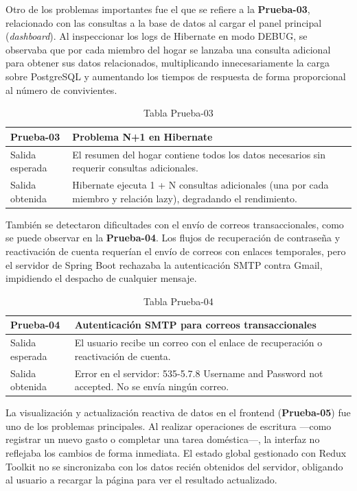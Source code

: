 Otro de los problemas importantes fue el que se refiere a la \textbf{Prueba-03}, relacionado con las consultas a la base de datos al cargar el panel principal (\emph{dashboard}). Al inspeccionar los logs de Hibernate en modo DEBUG, se observaba que por cada miembro del hogar se lanzaba una consulta adicional para obtener sus datos relacionados, multiplicando innecesariamente la carga sobre PostgreSQL y aumentando los tiempos de respuesta de forma proporcional al número de convivientes.

\begin{table}[H]
\centering
\begin{tabular}{|p{}|p{}|}
\hline
\textbf{Prueba-03} & \textbf{Problema N+1 en Hibernate} \\ \hline
Salida esperada & El resumen del hogar contiene todos los datos necesarios sin requerir consultas adicionales. \\ \hline
Salida obtenida & Hibernate ejecuta 1 + N consultas adicionales (una por cada miembro y relación lazy), degradando el rendimiento. \\ \hline
\end{tabular}
\caption{Tabla Prueba-03}
\label{tab:prueba03}
\end{table}

También se detectaron dificultades con el envío de correos transaccionales, como se puede observar en la \textbf{Prueba-04}. Los flujos de recuperación de contraseña y reactivación de cuenta requerían el envío de correos con enlaces temporales, pero el servidor de Spring Boot rechazaba la autenticación SMTP contra Gmail, impidiendo el despacho de cualquier mensaje.

\begin{table}[H]
\centering
\begin{tabular}{|p{}|p{}|}
\hline
\textbf{Prueba-04} & \textbf{Autenticación SMTP para correos transaccionales} \\ \hline
Salida esperada & El usuario recibe un correo con el enlace de recuperación o reactivación de cuenta. \\ \hline
Salida obtenida & Error en el servidor: 535-5.7.8 Username and Password not accepted. No se envía ningún correo. \\ \hline
\end{tabular}
\caption{Tabla Prueba-04}
\label{tab:prueba04}
\end{table}

La visualización y actualización reactiva de datos en el frontend (\textbf{Prueba-05}) fue uno de los problemas principales. Al realizar operaciones de escritura —como registrar un nuevo gasto o completar una tarea doméstica—, la interfaz no reflejaba los cambios de forma inmediata. El estado global gestionado con Redux Toolkit no se sincronizaba con los datos recién obtenidos del servidor, obligando al usuario a recargar la página para ver el resultado actualizado.

